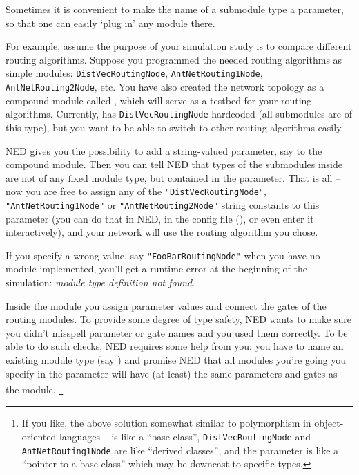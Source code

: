 Sometimes it is convenient to make the name of a submodule type a parameter,
so that one can easily `plug in' any module there.

For example, assume the purpose of your simulation study is
to compare different routing algorithms. Suppose you programmed
the needed routing algorithms as simple modules: \texttt{DistVecRoutingNode},
\texttt{AntNetRouting1Node}, \texttt{AntNetRouting2Node}, etc.
You have also created the network topology as a compound module
called , which will serve as a testbed for your routing
algorithms. Currently,  has \texttt{DistVecRoutingNode}
hardcoded (all submodules are of this type), but you want
to be able to switch to other routing algorithms easily.

NED gives you the possibility to add a string-valued parameter,
say  to the  compound module.
Then you can tell NED that types of the submodules inside 
are not of any fixed module type, but contained in the 
parameter. That is all -- now you are free to assign any of
the \texttt{"DistVecRoutingNode"}, \texttt{"AntNetRouting1Node"} or
\texttt{"AntNetRouting2Node"} string constants to this parameter
(you can do that in NED, in the config file (),
or even enter it interactively),
and your network will use the routing algorithm you chose.

If you specify a wrong value, say \texttt{"FooBarRoutingNode"}
when you have no  module implemented,
you'll get a runtime error at the beginning of the simulation:
\textit{module type definition not found}.

Inside the  module you assign parameter values
and connect the gates of the routing modules. To provide some degree
of type safety, NED wants to make sure you didn't misspell
parameter or gate names and you used them correctly.
To be able to do such checks, NED requires some help from you:
you have to name an existing module type (say )
and promise NED that all modules you're going you specify
in the  parameter will have (at least) the same
parameters and gates as the  module.
  \footnote{If you like, the above solution somewhat similar to polymorphism
  in object-oriented languages --  is like a
  ``base class'', \texttt{DistVecRoutingNode} and \texttt{AntNetRouting1Node}
  are like ``derived classes'', and the  parameter
  is like a ``pointer to a base class'' which may be downcast to specific
  types.}

